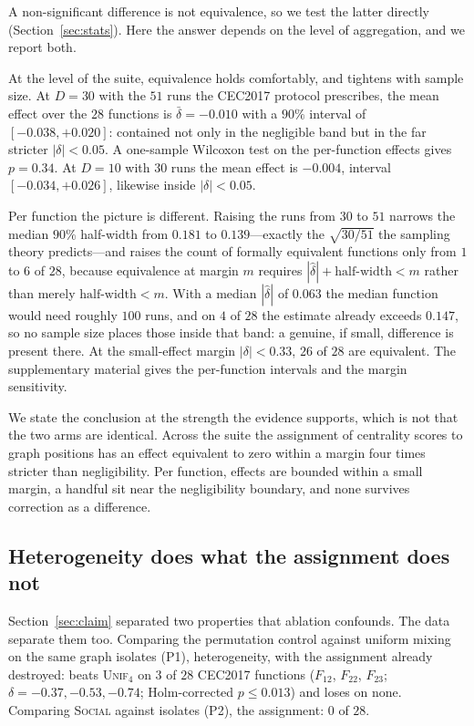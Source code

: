 A non-significant difference is not equivalence, so we test the latter
directly (Section~\ref{sec:stats}). Here the answer depends on the level of
aggregation, and we report both.

At the level of the suite, equivalence holds comfortably, and tightens with
sample size. At $D=30$ with the $51$ runs the CEC2017 protocol prescribes, the
mean effect over the $28$ functions is $\bar{\delta}=-0.010$ with a $90\%$
interval of $[-0.038,+0.020]$: contained not only in the negligible band but in
the far stricter $|\delta|<0.05$. A one-sample Wilcoxon test on the
per-function effects gives $p=0.34$. At $D=10$ with $30$ runs the mean effect
is $-0.004$, interval $[-0.034,+0.026]$, likewise inside $|\delta|<0.05$.

Per function the picture is different. Raising the runs from $30$ to $51$
narrows the median $90\%$ half-width from $0.181$ to $0.139$---exactly the
$\sqrt{30/51}$ the sampling theory predicts---and raises the count of formally
equivalent functions only from $1$ to $6$ of $28$, because equivalence at
margin $m$ requires $|\hat{\delta}|+\text{half-width}<m$ rather than merely
$\text{half-width}<m$. With a median $|\hat{\delta}|$ of $0.063$ the median
function would need roughly $100$ runs, and on $4$ of $28$ the estimate already
exceeds $0.147$, so no sample size places those inside that band: a genuine, if
small, difference is present there. At the small-effect margin $|\delta|<0.33$,
$26$ of $28$ are equivalent. The supplementary material gives the per-function
intervals and the margin sensitivity.

We state the conclusion at the strength the evidence supports, which is not
that the two arms are identical. Across the suite the assignment of centrality
scores to graph positions has an effect equivalent to zero within a margin four
times stricter than negligibility. Per function, effects are bounded within a
small margin, a handful sit near the negligibility boundary, and none survives
correction as a difference.

\subsection{Heterogeneity does what the assignment does not}
\label{sec:res:p1p2}

Section~\ref{sec:claim} separated two properties that ablation confounds. The
data separate them too. Comparing the permutation control against uniform
mixing on the same graph isolates (P1), heterogeneity, with the assignment
already destroyed: \permcontrol{} beats \textsc{Unif}$_4$ on $3$ of $28$
CEC2017 functions ($F_{12}$, $F_{22}$, $F_{23}$; $\delta=-0.37,-0.53,-0.74$;
Holm-corrected $p\le0.013$) and loses on none. Comparing \textsc{Social}
against \permcontrol{} isolates (P2), the assignment: $0$ of $28$.

